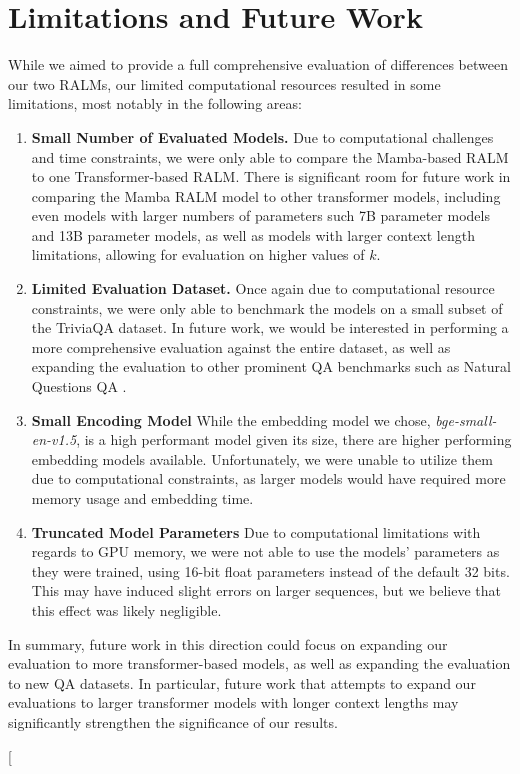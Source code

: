 \documentclass[11pt]{article}
\begin{document}
\section{Limitations and Future Work}
While we aimed to provide a full comprehensive evaluation of differences between our two RALMs, our limited computational resources resulted in some limitations, most notably in the following areas:
\begin{enumerate}
    \item \textbf{Small Number of Evaluated Models.} Due to computational challenges and time constraints, we were only able to compare the Mamba-based RALM to one Transformer-based RALM. There is significant room for future work in comparing the Mamba RALM model to other transformer models, including even models with larger numbers of parameters such 7B parameter models and 13B parameter models, as well as models with larger context length limitations, allowing for evaluation on higher values of $k$.
    \item \textbf{Limited Evaluation Dataset.} Once again due to computational resource constraints, we were only able to benchmark the models on a small subset of the TriviaQA dataset. In future work, we would be interested in performing a more comprehensive evaluation against the entire dataset, as well as expanding the evaluation to other prominent QA benchmarks such as Natural Questions QA \cite{kwiatkowski-etal-2019-natural}.
    \item \textbf{Small Encoding Model} While the embedding model we chose, \textit{bge-small-en-v1.5}, is a high performant model given its size, there are higher performing embedding models available. Unfortunately, we were unable to utilize them due to computational constraints, as larger models would have required more memory usage and embedding time.
    \item \textbf{Truncated Model Parameters} Due to computational limitations with regards to GPU memory, we were not able to use the models' parameters as they were trained, using 16-bit float parameters instead of the default 32 bits. This may have induced slight errors on larger sequences, but we believe that this effect was likely negligible.
\end{enumerate}
In summary, future work in this direction could focus on expanding our evaluation to more transformer-based models, as well as expanding the evaluation to new QA datasets. In particular, future work that attempts to expand our evaluations to larger transformer models with longer context lengths may significantly strengthen the significance of our results.
\clearpage


\clearpage
\twocolumn[
\end{document}
